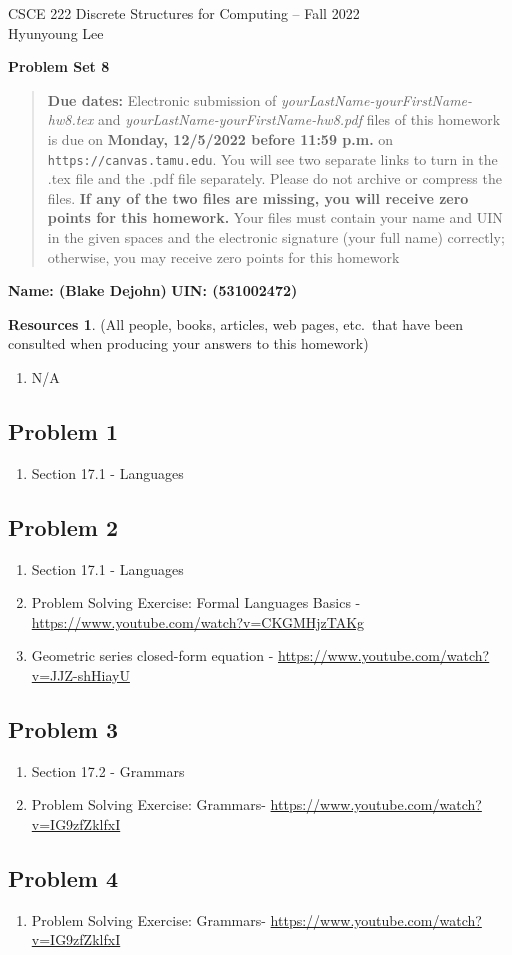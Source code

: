 \documentclass{article}
\theoremstyle{definition}
\newtheorem*{resources}{Resources}
\newcommand{\name}[2]{\noindent\textbf{Name: #1}\hfill \textbf{UIN: #2}
  \newcommand{\myName}{#1}
  \newcommand{\myUIN}{#2}
}
\newcommand{\problemset}[1]{\begin{center}\textbf{Problem Set #1}\end{center}}
\newcommand{\duedate}[1]{\begin{quote}\textbf{Due dates:} Electronic
    submission of \textsl{yourLastName-yourFirstName-hw8.tex} and 
    \textsl{yourLastName-yourFirstName-hw8.pdf} files of this homework is due on
    \textbf{#1} on \texttt{https://canvas.tamu.edu}. You will see two separate links
    to turn in the .tex file and the .pdf file separately. Please do not archive or compress the files.  
    \textbf{If any of the two files are missing, you will receive zero points for this homework.}
    Your files must contain your name and UIN in the given spaces and the electronic signature
    (your full name) correctly; otherwise, you may receive zero points for this homework\end{quote} }
\begin{document}
\begin{center}
{\large
CSCE 222 Discrete Structures for Computing -- Fall 2022\\[.5ex]
Hyunyoung Lee\\}
\end{center}
\problemset{8}
\duedate{Monday, 12/5/2022 before 11:59 p.m.}
\name{ (Blake Dejohn) }{ (531002472) } %
\begin{resources} (All people, books, articles, web pages, etc.\ that
  have been consulted when producing your answers to this homework)
\begin{enumerate}
\subsection*{Resources Overall (used for the whole document)}
\item N/A
\end{enumerate}
\subsection*{Problem 1}
\begin{enumerate}
\item Section 17.1 - Languages
\end{enumerate}
\subsection*{Problem 2}
\begin{enumerate}
\item Section 17.1 - Languages
\item Problem Solving Exercise: Formal Languages Basics - \url{https://www.youtube.com/watch?v=CKGMHjzTAKg}
\item Geometric series closed-form equation - \url{https://www.youtube.com/watch?v=JJZ-shHiayU}
\end{enumerate}
\subsection*{Problem 3}
\begin{enumerate}
\item Section 17.2 - Grammars
\item Problem Solving Exercise: Grammars- \url{https://www.youtube.com/watch?v=IG9zfZklfxI}
\end{enumerate}
\subsection*{Problem 4}
\begin{enumerate}
\item Problem Solving Exercise: Grammars- \url{https://www.youtube.com/watch?v=IG9zfZklfxI}
\end{enumerate}

\end{resources}
\end{document}

